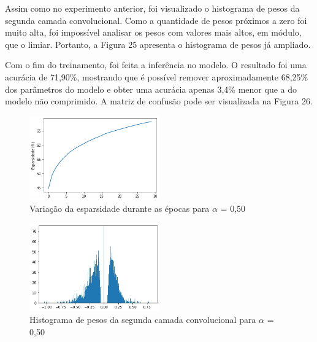 Assim como no experimento anterior, foi visualizado o histograma de pesos da segunda camada convolucional. Como a quantidade de pesos próximos a zero foi muito alta, foi impossível analisar os pesos com valores mais altos, em módulo, que o limiar. Portanto, a Figura 25 apresenta o histograma de pesos já ampliado.

Com o fim do treinamento, foi feita a inferência no modelo. O resultado foi uma acurácia de 71,90\%, mostrando que é possível remover aproximadamente 68,25\% dos parâmetros do modelo e obter uma acurácia apenas 3,4\% menor que a do modelo não comprimido. A matriz de confusão pode ser visualizada na Figura 26.

\begin{figure}[H]
	\includegraphics[width=0.5\textwidth, keepaspectratio=true]{figuras/CAP4/esparsidade05.png}
	\centering
	\caption[Variação da esparsidade durante as épocas para $\alpha$ = 0,50]{Variação da esparsidade durante as épocas para $\alpha$ = 0,50}
\end{figure}

\begin{figure}[H]
	\includegraphics[width=0.5\textwidth, keepaspectratio=true]{figuras/CAP4/hist_50_.png}
	\centering
	\caption[Histograma de pesos da segunda camada convolucional para $\alpha$ = 0,50]{Histograma de pesos da segunda camada convolucional para $\alpha$ = 0,50}
\end{figure}

